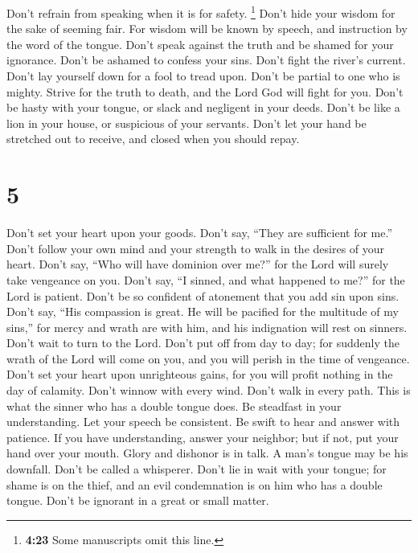  Don't refrain from speaking when it is for safety.
\footnote{\textbf{4:23} Some manuscripts omit this line.} Don't hide
your wisdom for the sake of seeming fair.  For wisdom
will be known by speech, and instruction by the word of the tongue.
 Don't speak against the truth and be shamed for your
ignorance.  Don't be ashamed to confess your sins. Don't
fight the river's current.  Don't lay yourself down for a
fool to tread upon. Don't be partial to one who is mighty.
 Strive for the truth to death, and the Lord God will
fight for you.  Don't be hasty with your tongue, or slack
and negligent in your deeds.  Don't be like a lion in
your house, or suspicious of your servants.  Don't let
your hand be stretched out to receive, and closed when you should repay.

\hypertarget{section-3}{%
\section{5}\label{section-3}}

 Don't set your heart upon your goods. Don't say, ``They
are sufficient for me.''  Don't follow your own mind and
your strength to walk in the desires of your heart.  Don't
say, ``Who will have dominion over me?'' for the Lord will surely take
vengeance on you.  Don't say, ``I sinned, and what
happened to me?'' for the Lord is patient.  Don't be so
confident of atonement that you add sin upon sins.  Don't
say, ``His compassion is great. He will be pacified for the multitude of
my sins,'' for mercy and wrath are with him, and his indignation will
rest on sinners.  Don't wait to turn to the Lord. Don't
put off from day to day; for suddenly the wrath of the Lord will come on
you, and you will perish in the time of vengeance.  Don't
set your heart upon unrighteous gains, for you will profit nothing in
the day of calamity.  Don't winnow with every wind. Don't
walk in every path. This is what the sinner who has a double tongue
does.  Be steadfast in your understanding. Let your
speech be consistent.  Be swift to hear and answer with
patience.  If you have understanding, answer your
neighbor; but if not, put your hand over your mouth. 
Glory and dishonor is in talk. A man's tongue may be his downfall.
 Don't be called a whisperer. Don't lie in wait with your
tongue; for shame is on the thief, and an evil condemnation is on him
who has a double tongue.  Don't be ignorant in a great or
small matter.

